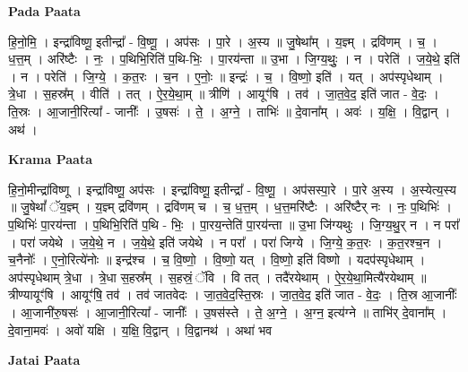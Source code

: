 \documentclass[17pt]{extarticle}
\begin{document}
\textbf{Pada Paata} \newline

हि॒नो॒मि॒ । इन्द्रा॑विष्णू॒ इतीन्द्रा᳚ - वि॒ष्णू॒ । अप॑सः । पा॒रे । अ॒स्य ॥ जु॒षेथा᳚म् । य॒ज्ञ्म् । द्रवि॑णम् । च॒ । ध॒त्त॒म् । अरि॑ष्टैः । नः॒ । प॒थिभि॒रिति॑ प॒थि-भिः॒ । पा॒रय॑न्ता ॥ उ॒भा । जि॒ग्य॒थुः॒ । न । परेति॑ । ज॒ये॒थे॒ इति॑ । न । परेति॑ । जि॒ग्ये॒ । क॒त॒रः । च॒न । ए॒नोः॒ ॥ इन्द्रः॑ । च॒ । वि॒ष्णो॒ इति॑ । यत् । अप॑स्पृधेथाम् । त्रे॒धा । स॒हस्र᳚म् । वीति॑ । तत् । ऐ॒र॒ये॒था॒म् ॥ त्रीणि॑ । आयूꣳ॑षि । तव॑ । जा॒त॒वे॒द॒ इति॑ जात - वे॒दः॒ । ति॒स्रः । आ॒जानी॒रित्या᳚ - जानीः᳚ । उ॒षसः॑ । ते॒ । अ॒ग्ने॒ । ताभिः॑ ॥ दे॒वाना᳚म् । अवः॑ । य॒क्षि॒ । वि॒द्वान् । अथ॑ ।  \newline


\textbf{Krama Paata} \newline

हि॒नो॒मीन्द्रा॑विष्णू । इन्द्रा॑विष्णू॒ अप॑सः । इन्द्रा॑विष्णू॒ इतीन्द्रा᳚ - वि॒ष्णू॒ । अप॑सस्पा॒रे । पा॒रे अ॒स्य । अ॒स्येत्य॒स्य ॥ जु॒षेथां᳚ ॅय॒ज्ञ्म् । य॒ज्ञ्म् द्रवि॑णम् । द्रवि॑णम् च । च॒ ध॒त्त॒म् । ध॒त्त॒मरि॑ष्टैः । अरि॑ष्टैर् नः । नः॒ प॒थिभिः॑ । प॒थिभिः॑ पा॒रय॑न्ता । प॒थिभि॒रिति॑ प॒थि - भिः॒ । पा॒रय॒न्तेति॑ पा॒रय॑न्ता ॥ उ॒भा जि॑ग्यथुः । जि॒ग्य॒थु॒र् न । न परा᳚ । परा॑ जयेथे । ज॒ये॒थे॒ न । ज॒ये॒थे॒ इति॑ जयेथे । न परा᳚ । परा॑ जिग्ये । जि॒ग्ये॒ क॒त॒रः । क॒त॒रश्च॒न । च॒नैनोः᳚ । ए॒नो॒रित्ये॑नोः ॥ इन्द्र॑श्च । च॒ वि॒ष्णो॒ । वि॒ष्णो॒ यत् । वि॒ष्णो॒ इति॑ विष्णो । यदप॑स्पृधेथाम् । अप॑स्पृधेथाम् त्रे॒धा । त्रे॒धा स॒हस्र᳚म् । स॒हस्रं॒ ॅवि । वि तत् । तदै॑रयेथाम् । ऐ॒र॒ये॒था॒मित्यै॑रयेथाम् ॥ त्रीण्यायूꣳ॑षि । आयूꣳ॑षि॒ तव॑ । तव॑ जातवेदः । जा॒त॒वे॒द॒स्ति॒स्रः । जा॒त॒वे॒द॒ इति॑ जात - वे॒दः॒ । ति॒स्र आ॒जानीः᳚ । आ॒जानी॑रु॒षसः॑ । आ॒जानी॒रित्या᳚ - जानीः᳚ । उ॒षस॑स्ते । ते॒ अ॒ग्ने॒ । अ॒ग्न॒ इत्य॑ग्ने ॥ ताभि॑र् दे॒वाना᳚म् । दे॒वाना॒मवः॑ । अवो॑ यक्षि । य॒क्षि॒ वि॒द्वान् । वि॒द्वानथ॑ । अथा॑ भव \newline

\textbf{Jatai Paata} \newline
\end{document}
